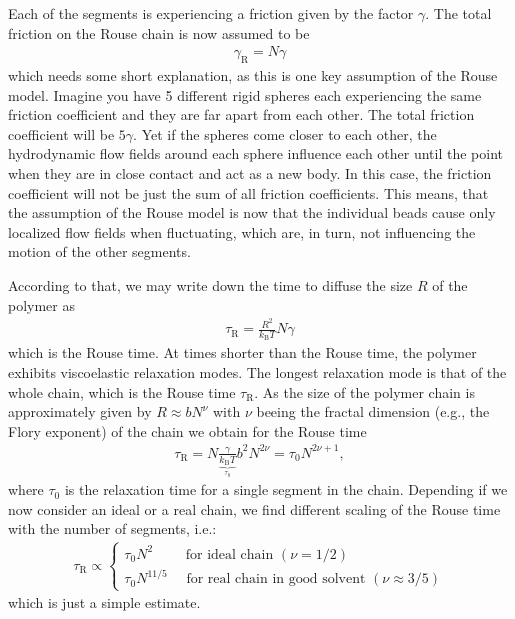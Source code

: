 \documentclass[letterpaper,10pt,english]{sphinxmanual}
\begin{document}
\sphinxAtStartPar
Each of the segments is experiencing a friction given by the factor \(\gamma\). The total friction on the Rouse chain is now assumed to be
\begin{equation*}
\begin{split}\gamma_\mathrm{R}=N\gamma\end{split}
\end{equation*}
\sphinxAtStartPar
which needs some short explanation, as this is one key assumption of the Rouse model. Imagine you have 5 different rigid spheres each experiencing the same friction coefficient and they are far apart from each other. The total friction coefficient will be \(5\gamma\). Yet if the spheres come closer to each other, the hydrodynamic flow fields around each sphere influence each other until the point when they are in close contact and act as a new body. In this case, the friction coefficient
will not be just the sum of all friction coefficients. This means, that the assumption of the Rouse model is now that the individual beads cause only localized flow fields when fluctuating, which are, in turn, not influencing the motion of the other segments.

\sphinxAtStartPar
According to that, we may write down the time to diffuse the size \(R\) of the polymer as
\begin{equation*}
\begin{split}\tau_\mathrm{R}=\frac{R^2}{k_\mathrm{B} T}N \gamma\end{split}
\end{equation*}
\sphinxAtStartPar
which is the Rouse time. At times shorter than the Rouse time, the polymer exhibits viscoelastic relaxation modes. The longest relaxation mode is that of the whole chain, which is the Rouse time \(\tau_\mathrm{R}\). As the size of the polymer chain is approximately given by \(R\approx bN^{\nu}\) with \(\nu\) beeing the fractal dimension (e.g., the Flory exponent) of the chain we obtain for the Rouse time
\begin{equation*}
\begin{split}\tau_\mathrm{R}=N \frac{\gamma}{\underbrace{k_\mathrm{B} T}_{\tau_{0}}} b^{2} N^{2 \nu}=\tau_{0} N^{2 \nu+1},\end{split}
\end{equation*}
\sphinxAtStartPar
where \(\tau_0\) is the relaxation time for a single segment in the chain. Depending if we now consider an ideal or a real chain, we find different scaling of the Rouse time with the number of segments, i.e.:
\begin{equation*}
\begin{split}\tau_\mathrm{R} \propto\left\{\begin{array}{l}
\tau_{0} N^{2}  \qquad \text { for ideal chain }(\nu=1 / 2) \\
\tau_{0} N^{11 / 5} \quad \,\,\text {for real chain in good solvent }(\nu \approx 3 / 5)
\end{array}\right.\end{split}
\end{equation*}
\sphinxAtStartPar
which is just a simple estimate.
\end{document}
